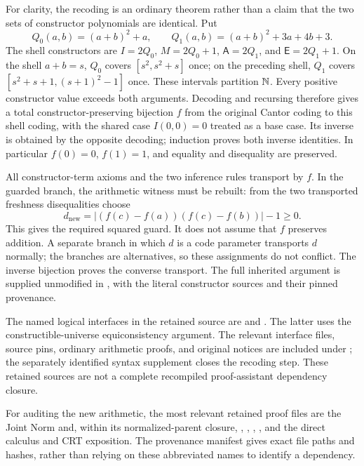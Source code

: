 \documentclass[11pt,letterpaper]{article}
\theoremstyle{definition}\newtheorem{definition}[theorem]{Definition}
\theoremstyle{remark}\newtheorem{remark}[theorem]{Remark}
\begin{document}
For clarity, the recoding is an ordinary theorem rather than a claim that
the two sets of constructor polynomials are identical. Put
\[
Q_0(a,b)=(a+b)^2+a,\qquad
Q_1(a,b)=(a+b)^2+3a+4b+3.
\]
The shell constructors are \(I=2Q_0\), \(M=2Q_0+1\),
\(\mathsf A=2Q_1\), and \(\mathsf E=2Q_1+1\).
On the shell \(a+b=s\), \(Q_0\) covers
\([s^2,s^2+s]\) once; on the preceding shell, \(Q_1\) covers
\([s^2+s+1,(s+1)^2-1]\) once. These intervals partition \(\mathbb N\).
Every positive constructor value exceeds both arguments. Decoding and
recursing therefore gives a total constructor-preserving bijection
\(f\) from the original Cantor coding to this shell coding, with the
shared case \(I(0,0)=0\) treated as a base case. Its inverse is obtained
by the opposite decoding; induction proves both inverse identities.
In particular \(f(0)=0\), \(f(1)=1\), and equality and disequality are
preserved.

All constructor-term axioms and the two inference rules transport by
\(f\). In the guarded branch, the arithmetic witness must be rebuilt:
from the two transported freshness disequalities choose
\[
d_{\mathrm{new}}
=\left|(f(c)-f(a))(f(c)-f(b))\right|-1\ge0.
\]
This gives the required squared guard. It does not assume that \(f\)
preserves addition. A separate branch in which \(d\) is a code parameter
transports \(d\) normally; the branches are alternatives, so these
assignments do not conflict. The inverse bijection proves the converse
transport. The full inherited argument is supplied unmodified in
, with
the literal constructor sources and their pinned provenance.

The named logical interfaces in the retained source are
 and
.
The latter uses the constructible-universe equiconsistency argument.
The relevant interface files, source pins, ordinary arithmetic proofs,
and original notices are included under
; the separately identified syntax supplement
closes the recoding step. These retained sources are not a complete
recompiled proof-assistant dependency closure.

For auditing the new arithmetic, the most relevant retained proof files
are the Joint Norm  and, within its
normalized-parent closure, ,
, ,
, and the direct calculus
and CRT exposition. The provenance manifest gives exact file paths and
hashes, rather than relying on these abbreviated names to identify a
dependency.
\end{document}
